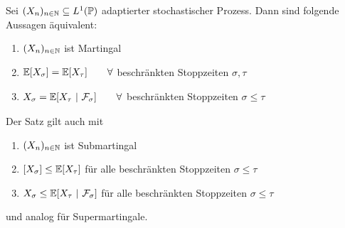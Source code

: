 \begin{theorem}\enter\label{theorem3.4}
	Sei $(X_n)_{n\in\mathbb{N}}\subseteq L^1(\mathbb{P})$ adaptierter stochastischer Prozess. Dann sind folgende Aussagen äquivalent:
	\begin{enumerate}[label=(\alph*)]
		\item $(X_n)_{n\in\mathbb{N}}$ ist Martingal
		\item $\begin{aligned}
			\mathbb{E}[X_\sigma]=\mathbb{E}[X_\tau]\qquad\forall
		\end{aligned}$ beschränkten Stoppzeiten $\sigma,\tau$
		\item $\begin{aligned}
			X_\sigma=\mathbb{E}[X_\tau~|~\mathcal{F}_\sigma]\qquad\forall
		\end{aligned}$  beschränkten Stoppzeiten $\sigma\leq\tau$
	\end{enumerate}
\end{theorem}

\begin{bemerkung}
	Der Satz gilt auch mit 
	\begin{enumerate}[label=(\alph*')]
		\item $(X_n)_{n\in\mathbb{N}}$ ist Submartingal
		\item $[X_\sigma]\leq\mathbb{E}[X_\tau]$ für alle beschränkten Stoppzeiten $\sigma\leq\tau$
		\item $X_\sigma\leq\mathbb{E}[X_\tau~|~\mathcal{F}_\sigma]$ für alle beschränkten Stoppzeiten $\sigma\leq\tau$
	\end{enumerate}
	und analog für Supermartingale.
\end{bemerkung}

